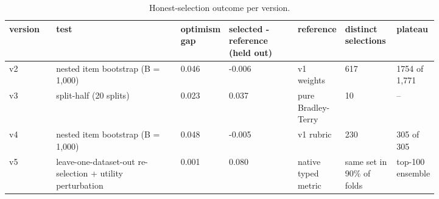 \begin{table}[htbp]
\centering\tiny
\caption{Honest-selection outcome per version.}
\label{tab:cmp_honesty}
\setlength{\tabcolsep}{3pt}
\begin{tabular}{lp{0.295\linewidth}p{0.062\linewidth}p{0.160\linewidth}p{0.098\linewidth}p{0.124\linewidth}p{0.083\linewidth}}
\toprule
version & test & optimism gap & selected - reference (held out) & reference & distinct selections & plateau \\
\midrule
v2 & nested item bootstrap (B = 1,000) & 0.046 & -0.006 & v1 weights & 617 & 1754 of 1,771 \\
v3 & split-half (20 splits) & 0.023 & 0.037 & pure Bradley-Terry & 10 & -- \\
v4 & nested item bootstrap (B = 1,000) & 0.048 & -0.005 & v1 rubric & 230 & 305 of 305 \\
v5 & leave-one-dataset-out re-selection + utility perturbation & 0.001 & 0.080 & native typed metric & same set in 90\% of folds & top-100 ensemble \\
\bottomrule
\end{tabular}
\end{table}
